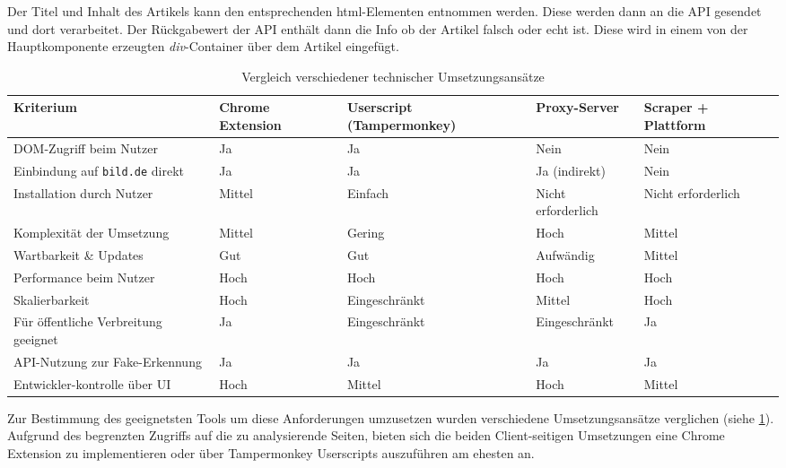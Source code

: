 Der Titel und Inhalt des Artikels kann den entsprechenden html-Elementen entnommen werden.
Diese werden dann an die API gesendet und dort verarbeitet. 
Der Rückgabewert der API enthält dann die Info ob der Artikel falsch oder echt ist.
Diese wird in einem von der Hauptkomponente erzeugten \textit{div}-Container über dem Artikel eingefügt.

\begin{table}[ht]
    \centering
    \renewcommand{\arraystretch}{1.3}
    \begin{tabular}{|p{2.5cm}|p{2.5cm}|p{2.5cm}|p{2.5cm}|p{2.5cm}|}
        \hline
        \textbf{Kriterium} & \textbf{Chrome Extension} & \textbf{Userscript (Tampermonkey)} & \textbf{Proxy-Server} & \textbf{Scraper + Plattform} \\
        \hline
        DOM-Zugriff beim Nutzer & Ja & Ja & Nein & Nein \\
        \hline
        Einbindung auf \texttt{bild.de} direkt & Ja & Ja & Ja (indirekt) & Nein \\
        \hline
        Installation durch Nutzer & Mittel & Einfach & Nicht erforderlich & Nicht erforderlich\\
        \hline
        Komplexität der Umsetzung & Mittel & Gering & Hoch & Mittel \\
        \hline
        Wartbarkeit \& Updates & Gut & Gut & Aufwändig & Mittel \\
        \hline
        Performance beim Nutzer & Hoch & Hoch & Hoch & Hoch \\
        \hline
        Skalierbarkeit & Hoch & Eingeschränkt & Mittel & Hoch \\
        \hline
        Für öffentliche Verbreitung geeignet & Ja & Eingeschränkt & Eingeschränkt & Ja \\
        \hline
        API-Nutzung zur Fake-Erkennung & Ja & Ja & Ja & Ja \\
        \hline
        Entwickler-kontrolle über UI & Hoch & Mittel & Hoch & Mittel \\
        \hline
    \end{tabular}
    \caption{Vergleich verschiedener technischer Umsetzungsansätze}
    \label{table:technischeAnsaetze}
\end{table}

Zur Bestimmung des geeignetsten Tools um diese Anforderungen umzusetzen wurden verschiedene Umsetzungsansätze verglichen (siehe \ref{table:technischeAnsaetze}).
Aufgrund des begrenzten Zugriffs auf die zu analysierende Seiten, bieten sich die beiden Client-seitigen Umsetzungen 
eine Chrome Extension zu implementieren oder über Tampermonkey Userscripts auszuführen am ehesten an.

